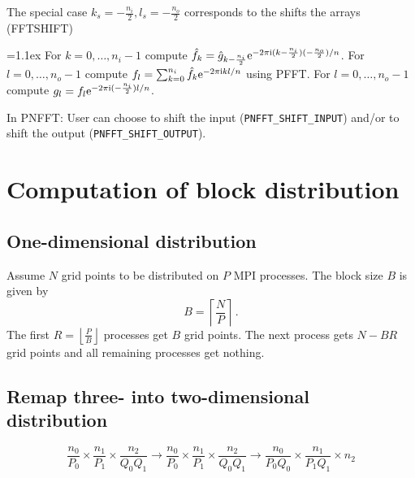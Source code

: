The special case $k_s=-\frac{n_i}{2}, l_s=-\frac{n_o}{2}$ corresponds to the shifts the arrays (\textsf{FFTSHIFT})
\begin{algorithm}
  \begin{algorithmic}[1]
    \itemsep=1.1ex
    \State For $k=0,\hdots,n_i-1$ compute $\hat f_k = \hat g_{k-\frac{n_i}{2}} \mathrm{e}^{-2\pi{\ensuremath{\text{\scriptsize{i}}}} (k-\frac{n_i}{2})(-\frac{n_o}{2})/n}$.
    \State For $l=0,\hdots,n_o-1$ compute $f_l = \sum_{k=0}^{n_i} \hat f_k \mathrm{e}^{-2\pi{\ensuremath{\text{\scriptsize{i}}}} kl/n}$ using PFFT.
    \State For $l=0,\hdots,n_o-1$ compute $g_l = f_l \mathrm{e}^{-2\pi{\ensuremath{\text{\scriptsize{i}}}} (-\frac{n_i}{2})l/n}$.
  \end{algorithmic}
\end{algorithm}


In PNFFT: User can choose to shift the input (\verb+PNFFT_SHIFT_INPUT+) and/or to shift the output (\verb+PNFFT_SHIFT_OUTPUT+).





\section{Computation of block distribution}
\subsection{One-dimensional distribution}
Assume $N$ grid points to be distributed on $P$ MPI processes. The block size $B$ is given by
\begin{equation*}
  B = \left\lceil \frac{N}{P} \right\rceil\,.
\end{equation*}
The first $R=\left\lfloor\frac{P}{B}\right\rfloor$ processes get $B$ grid points. The next process gets $N-BR$ grid points and all remaining processes get nothing.


\subsection{Remap three- into two-dimensional distribution}
\begin{equation*}
  \frac{n_0}{P_0} \times \frac{n_1}{P_1} \times \frac{n_2}{Q_0Q_1}
  \to
  \frac{n_0}{P_0} \times \frac{n_1}{P_1} \times \frac{n_2}{Q_0Q_1}
  \to
  \frac{n_0}{P_0Q_0} \times \frac{n_1}{P_1Q_1} \times n_2
\end{equation*}

